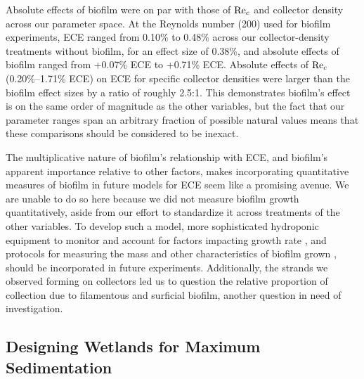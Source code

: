 \documentclass[geosciences,article,submit,moreauthors,pdftex]{Definitions/mdpi}
\begin{document}
Absolute effects of biofilm were on par with those of $\mathrm{Re}_c$ and collector density across our parameter space. At the Reynolds number (200) used for biofilm experiments, ECE ranged from 0.10\% to 0.48\% across our collector-density treatments without biofilm, for an effect size of 0.38\%, and absolute effects of biofilm ranged from +0.07\% ECE to +0.71\% ECE. Absolute effects of $\mathrm{Re}_c$ (0.20\%--1.71\% ECE) on ECE for specific collector densities were larger than the biofilm effect sizes by a ratio of roughly 2.5:1. This demonstrates biofilm's effect is on the same order of magnitude as the other variables, but the fact that our parameter ranges span an arbitrary fraction of possible natural values means that these comparisons should be considered to be inexact.

The multiplicative nature of biofilm's relationship with ECE, and biofilm's apparent importance relative to other factors, makes incorporating quantitative measures of biofilm in future models for ECE seem like a promising avenue. We are unable to do so here because we did not measure biofilm growth quantitatively, aside from our effort to standardize it across treatments of the other variables. To develop such a model, more sophisticated hydroponic equipment to monitor and account for factors impacting growth rate \cite{schnurr2014effect, trulear1982dynamics}, and protocols for measuring the mass and other characteristics of biofilm grown \cite{liu1994simple,characklis1982dynamics}, should be incorporated in future experiments. Additionally, the strands we observed forming on collectors led us to question the relative proportion of collection due to filamentous and surficial biofilm, another question in need of investigation.

\subsection{Designing Wetlands for Maximum Sedimentation}



\vspace{6pt} 


\end{document}
